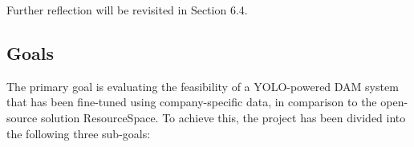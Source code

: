 \documentclass[a4paper,10pt,twocolumn]{article}
\numberwithin{figure}{section}
\numberwithin{table}{section}
\begin{document}
\vspace{0.3cm}
Further reflection will be revisited in Section 6.4.



\subsection{Goals}


The primary goal is evaluating the feasibility of a YOLO-powered DAM
system that has been fine-tuned using company-specific data, 
in comparison to the open-source solution ResourceSpace.
To achieve this, the project has been divided into the following three sub-goals:
\end{document}
